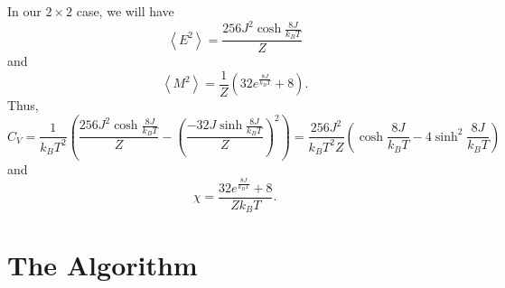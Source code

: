 \documentclass[12pt]{article}
\numberwithin{equation}{section}
\begin{document}
In our $2\times2$ case, we will have
$$
\left<E^{2}\right> = \frac{256J^{2}\cosh{\frac{8J}{k_{B}T}}}{Z}
$$
and
$$
\left<M^{2}\right> = \frac{1}{Z}\left(32e^{\frac{8J}{k_{B}T}}+8\right).
$$
Thus,
\begin{equation}
\label{eq:cv2x2}
C_{V}=\frac{1}{k_{B}T^{2}}\left(\frac{256J^{2}\cosh{\frac{8J}{k_{B}T}}}{Z}-\left(\frac{-32J\sinh{\frac{8J}{k_{B}T}}}{Z}\right)^{2}\right)=\frac{256J^{2}}{k_{B}T^{2}Z}\left(\cosh{\frac{8J}{k_{B}T}}-4\sinh^{2}{\frac{8J}{k_{B}T}}\right)
\end{equation}
and
\begin{equation}
\label{eq:chi2x2}
\chi = \frac{32e^{\frac{8J}{k_{B}T}}+8}{Zk_{B}T}.
\end{equation}

\section{The Algorithm}
\label{sec:algorithm}
\end{document}
